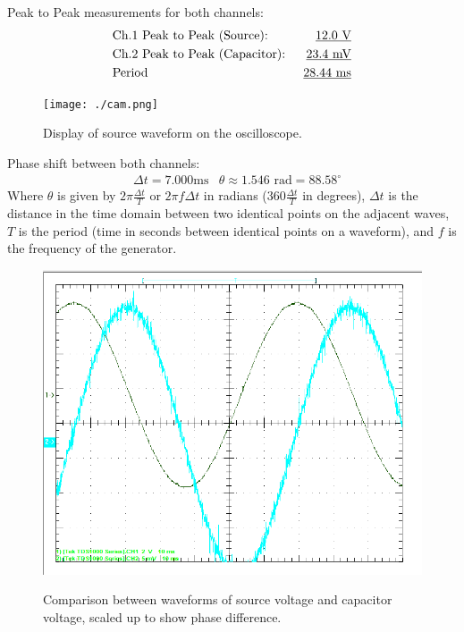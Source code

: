 \documentclass[twocolumn,english]{IEEEtran}
\theoremstyle{plain}
\theoremstyle{plain}
\begin{document}
\noindent Peak to Peak measurements for both channels:
\begin{align*}
 &\text{Ch.1 Peak to Peak (Source): }		&\text{\underline{$12.0$ V}}	\\
 &\text{Ch.2 Peak to Peak (Capacitor): }	&\text{\underline{$23.4$ mV}}	\\
 &\text{Period}		&\text{\underline{28.44 ms}}
\end{align*}

\begin{figure}[h!]
  \begin{centering}
  \begin{center}
  \texttt{[image: ./cam.png]}
  \label{fig:source_voltage}
  \caption{Display of source waveform on the oscilloscope.}
  \end{center}
  \par\end{centering}
  \end{figure}

\noindent Phase shift between both channels:
\begin{align*}
 &\Delta t = 7.000\text{ms}	&\theta \approx 1.546\text{ rad} = 88.58^{\circ}
\end{align*}
Where $\theta$ is given by  $2\pi\frac{\Delta t}{T}$ or $2\pi f \Delta t$ in radians ($360\frac{\Delta t}{T}$ in degrees), $\Delta t$ is the distance in the time domain between two identical points on the adjacent waves, $T$ is the period (time in seconds between identical points on a waveform), and $f$ is the frequency of the generator.

\begin{figure}[h!]
  \begin{centering}
  \begin{center}
  \includegraphics[width=\linewidth]{./comparison.png}
  \label{fig:parallel_diagram}
  \caption{Comparison between waveforms of source voltage and capacitor voltage, scaled up to show phase difference.}
  \end{center}
  \par\end{centering}
  \end{figure}
\end{document}

